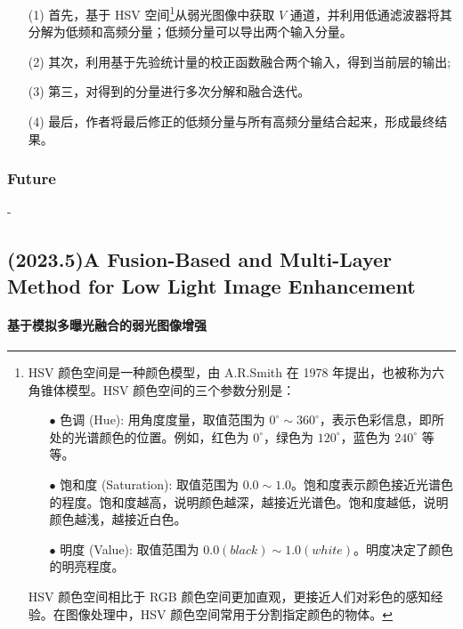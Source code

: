 \documentclass[a4paper, 10pt]{article}
\begin{document}
			\begin{itemize}
				\item[(1)] 
				首先，基于 HSV 空间\footnote{HSV 颜色空间是一种颜色模型，由 A.R.Smith 在 1978 年提出，也被称为六角锥体模型。HSV 颜色空间的三个参数分别是：
					\begin{itemize}
						\item[$\bullet$] 
						色调 (Hue): 用角度度量，取值范围为 $0^{\circ} \sim 360^{\circ}$，表示色彩信息，即所处的光谱颜色的位置。例如，红色为 $0^{\circ}$，绿色为 $120^{\circ}$，蓝色为 $240^{\circ}$ 等等。
						
						\item[$\bullet$]
						饱和度 (Saturation): 取值范围为 $0.0 \sim 1.0$。饱和度表示颜色接近光谱色的程度。饱和度越高，说明颜色越深，越接近光谱色。饱和度越低，说明颜色越浅，越接近白色。
						
						\item[$\bullet$]
						明度 (Value): 取值范围为 $0.0 (black) \sim 1.0 (white)$。明度决定了颜色的明亮程度。
					\end{itemize}
					
					HSV 颜色空间相比于 RGB 颜色空间更加直观，更接近人们对彩色的感知经验。在图像处理中，HSV 颜色空间常用于分割指定颜色的物体。}从弱光图像中获取 $V$ 通道，并利用低通滤波器将其分解为低频和高频分量；低频分量可以导出两个输入分量。
				
				\item[(2)]
				其次，利用基于先验统计量的校正函数融合两个输入，得到当前层的输出;
				
				\item[(3)]
				第三，对得到的分量进行多次分解和融合迭代。
				
				\item[(4)]
				最后，作者将最后修正的低频分量与所有高频分量结合起来，形成最终结果。
				
			\end{itemize}	
			
			\subsubsection{Future}
			
			-
		
		\subsection{(2023.5)A Fusion-Based and Multi-Layer Method for Low Light Image Enhancement}
		
		\paragraph{基于模拟多曝光融合的弱光图像增强}
		
\end{document}
